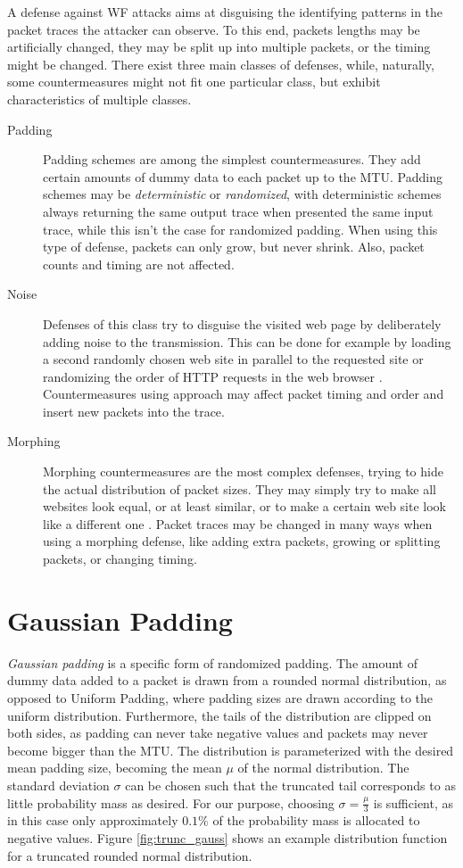 \documentclass[
	ruledheaders=chapter,
	class=report,
	thesis={type=master, department=inf},
	accentcolor=1c,
	custommargins=true,
	marginpar=false,
	parskip=half-,
	fontsize=11pt,
]{tudapub}
\begin{document}
	A defense against WF attacks aims at disguising the identifying patterns in the packet traces the attacker can observe. To this end, packets lengths may be artificially changed, they may be split up into multiple packets, or the timing might be changed. There exist three main classes of defenses, while, naturally, some countermeasures might not fit one particular class, but exhibit characteristics of multiple classes.
	
	\begin{description}
		\item[Padding] Padding schemes are among the simplest countermeasures. They add certain amounts of dummy data to each packet up to the MTU. Padding schemes may be \textit{deterministic} or \textit{randomized}, with deterministic schemes always returning the same output trace when presented the same input trace, while this isn't the case for randomized padding. When using this type of defense, packets can only grow, but never shrink. Also, packet counts and timing are not affected.
		\item[Noise] Defenses of this class try to disguise the visited web page by deliberately adding noise to the transmission. This can be done for example by loading a second randomly chosen web site in parallel to the requested site \cite{Panchenko2011} or randomizing the order of HTTP requests in the web browser \cite{Perry2011}. Countermeasures using approach may affect packet timing and order and insert new packets into the trace.
		\item[Morphing] Morphing countermeasures are the most complex defenses, trying to hide the actual distribution of packet sizes. They may simply try to make all websites look equal, or at least similar, \cite{Dyer2012,Cai2014,Cai2014a} or to make a certain web site look like a different one \cite{Wright2009}. Packet traces may be changed in many ways when using a morphing defense, like adding extra packets, growing or splitting packets, or changing timing.
	\end{description}
	
	\section{Gaussian Padding}
	\label{gaussian_padding}
	
	\textit{Gaussian padding} is a specific form of randomized padding. The amount of dummy data added to a packet is drawn from a rounded normal distribution, as opposed to Uniform Padding, where padding sizes are drawn according to the uniform distribution. Furthermore, the tails of the distribution are clipped on both sides, as padding can never take negative values and packets may never become bigger than the MTU. The distribution is parameterized with the desired mean padding size, becoming the mean $\mu$ of the normal distribution. The standard deviation $\sigma$ can be chosen such that the truncated tail corresponds to as little probability mass as desired. For our purpose, choosing $\sigma = \frac{\mu}{3}$ is sufficient, as in this case only approximately $0.1\%$ of the probability mass is allocated to negative values. Figure \ref{fig:trunc_gauss} shows an example distribution function for a truncated rounded normal distribution.
	
\end{document}
